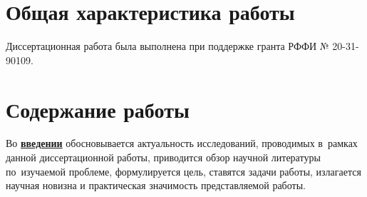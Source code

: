 \section*{Общая характеристика работы}

\newcommand{\actuality}{\pdfbookmark[1]{Актуальность}{actuality}\underline{\textbf{\actualityTXT}}}
\newcommand{\progress}{\pdfbookmark[1]{Разработанность темы}{progress}\underline{\textbf{\progressTXT}}}
\newcommand{\aim}{\pdfbookmark[1]{Цели}{aim}\underline{{\textbf\aimTXT}}}
\newcommand{\tasks}{\pdfbookmark[1]{Задачи}{tasks}\underline{\textbf{\tasksTXT}}}
\newcommand{\aimtasks}{\pdfbookmark[1]{Цели и задачи}{aimtasks}\aimtasksTXT}
\newcommand{\novelty}{\pdfbookmark[1]{Научная новизна}{novelty}\underline{\textbf{\noveltyTXT}}}
\newcommand{\influence}{\pdfbookmark[1]{Практическая значимость}{influence}\underline{\textbf{\influenceTXT}}}
\newcommand{\methods}{\pdfbookmark[1]{Методология и методы исследования}{methods}\underline{\textbf{\methodsTXT}}}
\newcommand{\defpositions}{\pdfbookmark[1]{Положения, выносимые на защиту}{defpositions}\underline{\textbf{\defpositionsTXT}}}
\newcommand{\reliability}{\pdfbookmark[1]{Достоверность}{reliability}\underline{\textbf{\reliabilityTXT}}}
\newcommand{\probation}{\pdfbookmark[1]{Апробация}{probation}\underline{\textbf{\probationTXT}}}
\newcommand{\contribution}{\pdfbookmark[1]{Личный вклад}{contribution}\underline{\textbf{\contributionTXT}}}
\newcommand{\publications}{\pdfbookmark[1]{Публикации}{publications}\underline{\textbf{\publicationsTXT}}}


Диссертационная работа была выполнена при поддержке гранта РФФИ № 20-31-90109.


\section*{Содержание работы}
Во \underline{\textbf{введении}} обосновывается актуальность
исследований, проводимых в~рамках данной диссертационной работы,
приводится обзор научной литературы по~изучаемой проблеме,
формулируется цель, ставятся задачи работы, излагается научная новизна
и практическая значимость представляемой работы.

